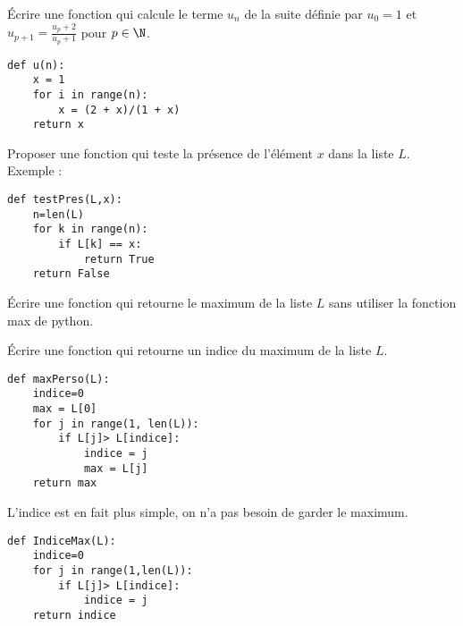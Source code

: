 \begin{Exercise}Écrire une fonction  qui calcule le terme $u_n$ de la suite définie par $u_0=1$ et $\displaystyle u_{p+1} = \frac{u_p+2}{u_p+1}$ pour $p\in \N$.
\end{Exercise}
\begin{Answer}
\begin{lstlisting}
def u(n):
    x = 1
    for i in range(n):
        x = (2 + x)/(1 + x)
    return x
\end{lstlisting}
\end{Answer}
\begin{Exercise}Proposer une fonction  qui teste la présence de l'élément $x$ dans la liste $L$. 
Exemple :  
\end{Exercise}
\begin{Answer}
\begin{lstlisting}
def testPres(L,x):
    n=len(L)
    for k in range(n):
        if L[k] == x:
            return True
    return False 
\end{lstlisting}
\end{Answer}
\newpage
\begin{Exercise}
Écrire une fonction  qui retourne le maximum de la liste $L$ sans utiliser la fonction max de python.

Écrire une fonction  qui retourne un indice du maximum de la liste $L$.
\end{Exercise}
\begin{Answer}
\begin{lstlisting}
def maxPerso(L):
    indice=0
    max = L[0]
    for j in range(1, len(L)):
        if L[j]> L[indice]:
            indice = j
            max = L[j]
    return max
\end{lstlisting}

\newpage

L'indice est en fait plus simple, on n'a pas besoin de garder le maximum.
\begin{lstlisting}
def IndiceMax(L):
    indice=0
    for j in range(1,len(L)):
        if L[j]> L[indice]:
            indice = j
    return indice
\end{lstlisting}
\end{Answer}
